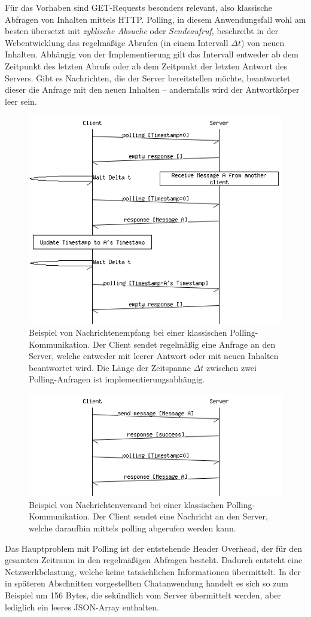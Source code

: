 \documentclass[sigplan, screen]{acmart}
\begin{document}
Für das Vorhaben sind GET-Requests besonders relevant, also klassische Abfragen von Inhalten mittels HTTP.
Polling, in diesem Anwendungsfall wohl am besten übersetzt mit \emph{zyklische Absuche} oder \emph{Sendeaufruf},
beschreibt in der Webentwicklung das regelmäßige Abrufen (in einem Intervall $\Delta t$) von neuen Inhalten.
Abhängig von der Implementierung gilt das Intervall entweder ab dem Zeitpunkt des letzten Abrufs oder ab dem Zeitpunkt der letzten Antwort des Servers.
Gibt es Nachrichten, die der Server bereitstellen möchte, beantwortet dieser die Anfrage mit den neuen Inhalten --
andernfalls wird der Antwortkörper leer sein.

\begin{figure}[H]
  \centering
  \includegraphics[width=.45\textwidth]{assets/msc/polling.png}
  \caption[Nachrichtenempfang bei Polling-Kommunikation]{Beispiel von Nachrichtenempfang bei einer klassischen Polling-Kommunikation.
    Der Client sendet regelmäßig eine Anfrage an den Server, welche entweder mit leerer Antwort oder mit neuen Inhalten beantwortet wird.
    Die Länge der Zeitspanne $\Delta t$ zwischen zwei Polling-Anfragen ist implementierungsabhängig.}
  \label{fig:polling}
\end{figure}

\begin{figure}[H]
  \centering
  \includegraphics[width=.45\textwidth]{assets/msc/polling-send.png}
  \caption[Nachrichtenversand bei Polling-Kommunikation]{Beispiel von Nachrichtenversand bei einer klassischen Polling-Kommunikation.
    Der Client sendet eine Nachricht an den Server, welche daraufhin mittels polling abgerufen werden kann.}
  \label{fig:polling_send}
\end{figure}

Das Hauptproblem mit Polling ist der entstehende Header Overhead, der für den gesamten Zeitraum in den regelmäßigen Abfragen besteht.
Dadurch entsteht eine Netzwerkbelastung, welche keine tatsächlichen Informationen übermittelt.
In der in späteren Abschnitten vorgestellten Chatanwendung handelt es sich so zum Beispiel um 156 Bytes, die sekündlich vom Server übermittelt werden,
aber lediglich ein leeres JSON-Array enthalten.
\end{document}
